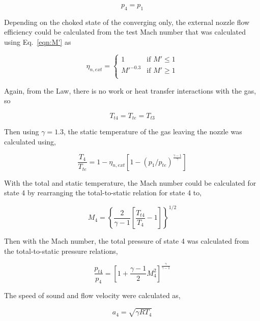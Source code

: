 \documentclass[conf]{new-aiaa} %
\begin{document}
\begin{equation}
    \label{eqn:p4}
    p_4=p_1
\end{equation}

Depending on the choked state of the converging only, the external nozzle flow efficiency could be calculated from the test Mach number that was calculated using Eq.~\eqref{eqn:M'} as

\begin{equation}
    \label{eqn:eta_n_ext}
    \eta_{n,ext} = \begin{cases}
        1 & \text{if } M' \leq 1 \\
        M'^{-0.3} & \text{if } M' \geq 1 \\
    \end{cases}
\end{equation}

Again, from the  Law, there is no work or heat transfer interactions with the gas, so

\begin{equation}
    \label{eqn:Tt4}
    T_{t4}=T_{te}=T_{t3}
\end{equation}

Then using $\gamma=1.3$, the static temperature of the gas leaving the nozzle was calculated using,

\begin{equation}
    \label{eqn:T4}
    \frac{T_4}{T_{te}}=1-\eta_{n,ext}\left[1-\left(p_1/p_{te}\right)^\frac{\gamma-1}{\gamma}\right]
\end{equation}

With the total and static temperature, the Mach number could be calculated for state 4 by rearranging the total-to-static relation for state 4 to,

\begin{equation}
    \label{eqn:M4}
    M_4=\left\{\frac{2}{\gamma-1}\left[\frac{T_{t4}}{T_4}-1\right]\right\}^{1/2}
\end{equation}

Then with the Mach number, the total pressure of state 4 was calculated from the total-to-static pressure relations,

\begin{equation}
    \label{eqn:pt4}
    \frac{p_{t4}}{p_4}=\left[1+\frac{\gamma-1}{2}M_4^2\right]^\frac{\gamma}{\gamma-1}
\end{equation}

The speed of sound and flow velocity were calculated as,

\begin{equation}
    \label{eqn:a4}
    a_4=\sqrt{\gamma R T_4}
\end{equation}
\end{document}
